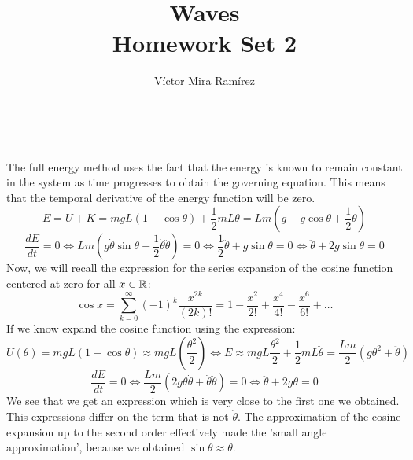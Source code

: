 \documentclass{report}
\title{\Huge{Waves\\Homework Set 2}}
\author{Víctor Mira Ramírez}
\date{\number\month -\number\day -\number\year}
\begin{document}
\maketitle
\clearpage


  \vspace{0.4cm}
  \noindent The full energy method uses the fact that the energy is known to remain constant in the system as time progresses to obtain the governing equation. This means that the temporal derivative of the energy function will be zero.
  \[E=U+K=mgL(1-\cos\theta)+\dfrac{1}{2}mL\dot{\theta}=Lm\left(g-g\cos\theta+\dfrac{1}{2}\dot{\theta}\right)\]
  \[\dfrac{dE}{dt}=0\Longleftrightarrow Lm\left(g\dot{\theta}\sin\theta+\dfrac{1}{2}\dot{\theta}\ddot{\theta}\right)=0\Longleftrightarrow \dfrac12\ddot{\theta}+g\sin\theta=0\Longleftrightarrow\boxed{\ddot{\theta}+2g\sin\theta=0}\]
  Now, we will recall the expression for the series expansion of the cosine function centered at zero for all $x\in\mathbb{R}$:
  \[\cos x=\sum_{k=0}^\infty (-1)^k\dfrac{x^{2k}}{(2k)!}=1-\dfrac{x^2}{2!}+\dfrac{x^4}{4!}-\dfrac{x^6}{6!}+\dots\]
  If we know expand the cosine function using the expression:
  \[U(\theta)=mgL(1-\cos\theta)\approx mgL(\dfrac{\theta^2}{2})\Longleftrightarrow E\approx mgL\dfrac{\theta^2}{2}+\dfrac{1}{2}mL\ddot{\theta}=\dfrac{Lm}{2}\left(g\theta^2+\ddot{\theta}\right)\]
  \[\dfrac{dE}{dt}=0\Longleftrightarrow\dfrac{Lm}{2}(2g\theta\dot{\theta}+\dot{\theta}\ddot{\theta})=0\Longleftrightarrow\boxed{\ddot{\theta}+2g\theta=0}\]
  We see that we get an expression which is very close to the first one we obtained. This expressions differ on the term that is not $\ddot{\theta}$. The approximation of the cosine expansion up to the second order effectively made the 'small angle approximation', because we obtained $\sin\theta\approx\theta$.
\end{document}
